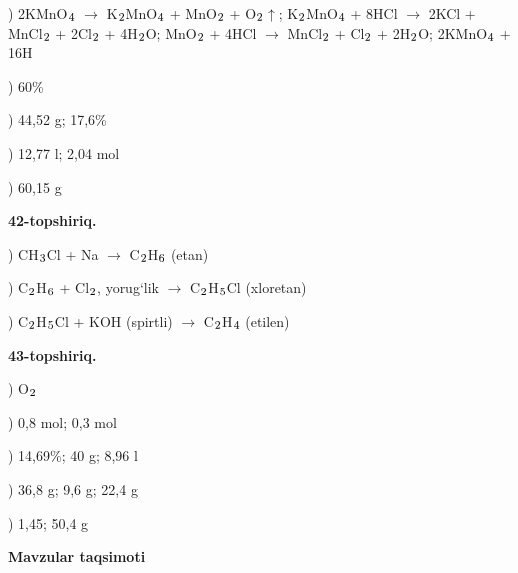 \documentclass[11pt,a4paper]{article}
\renewcommand{\textsubscript}[1]{\ensuremath{_{\text{\fontsize{8}{8}\selectfont #1}}}}
\begin{document}
) 2KMnO\textsubscript{4} $\to$ K\textsubscript{2}MnO\textsubscript{4} + MnO\textsubscript{2} + O\textsubscript{2}$\uparrow$; K\textsubscript{2}MnO\textsubscript{4} + 8HCl $\to$ 2KCl + MnCl\textsubscript{2} + 2Cl\textsubscript{2} + 4H\textsubscript{2}O; MnO\textsubscript{2} + 4HCl $\to$ MnCl\textsubscript{2} + Cl\textsubscript{2} + 2H\textsubscript{2}O; 2KMnO\textsubscript{4} + 16H\par
{}) 60\%\par
{}) 44,52 g; 17,6\%\par
{}) 12,77 l; 2,04 mol\par
{}) 60,15 g\par
\noindent\textbf{42-topshiriq.}\par
{}) CH\textsubscript{3}Cl + Na $\to$ C\textsubscript{2}H\textsubscript{6} (etan)\par
{}) C\textsubscript{2}H\textsubscript{6} + Cl\textsubscript{2}, yorug`lik $\to$ C\textsubscript{2}H\textsubscript{5}Cl (xloretan)\par
{}) C\textsubscript{2}H\textsubscript{5}Cl + KOH (spirtli) $\to$ C\textsubscript{2}H\textsubscript{4} (etilen)\par
\noindent\textbf{43-topshiriq.}\par
{}) O\textsubscript{2}\par
{}) 0,8 mol; 0,3 mol\par
{}) 14,69\%; 40 g; 8,96 l\par
{}) 36,8 g; 9,6 g; 22,4 g\par
{}) 1,45; 50,4 g\par
\par\bigskip\noindent\textbf{Mavzular taqsimoti}\par\smallskip
\end{document}

